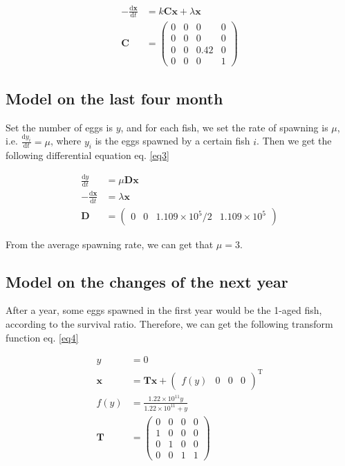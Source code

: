 \begin{align}
    \label{eq2}
    -\frac{\mathrm d \bm x}{\mathrm d t} &= k \mathbf C \bm x + \lambda \bm x \\
    \mathbf C &= \begin{pmatrix}0&0&0&0\\0&0&0&0\\0&0&0.42&0\\0&0&0&1\end{pmatrix}
\end{align}
\subsection{Model on the last four month}
Set the number of eggs is $y$, and for each fish, we set the rate of spawning is $\mu$, i.e. $\frac {\mathrm d y_i}{\mathrm d t} = \mu$, where $y_i$ is the eggs spawned by a certain fish $i$. Then we get the following differential equation eq. \ref{eq3}

\begin{align}
    \label{eq3}
    \frac {\mathrm d y}{\mathrm d t} &= \mu \mathbf D \bm x\\
    -\frac{\mathrm d \bm x}{\mathrm d t} &=\lambda \bm x\\
    \mathbf D &= \begin{pmatrix} 0 & 0 & 1.109\times10^5/2&1.109\times10^5\end{pmatrix}
\end{align}

From the average spawning rate, we can get that $\mu = 3$.

\subsection{Model on the changes of the next year}

After a year, some eggs spawned in the first year would be the 1-aged fish, according to the survival ratio. Therefore, we can get the following transform function eq. \ref{eq4}

\begin{align}
    \label{eq4}
    y &= 0\\
    \bm x &= \mathbf T \bm x +\begin{pmatrix} f(y)&0&0&0\end{pmatrix}^{\mathrm T}\\
    f(y) &= \frac{1.22\times 10 ^{11}y}{1.22\times 10 ^{11} + y}\\
    \mathbf T &= \begin{pmatrix} 0 & 0 & 0 & 0 \\ 1& 0 & 0 & 0 \\ 0 & 1 & 0 & 0 \\0 & 0 & 1 & 1 \end{pmatrix}
\end{align}


